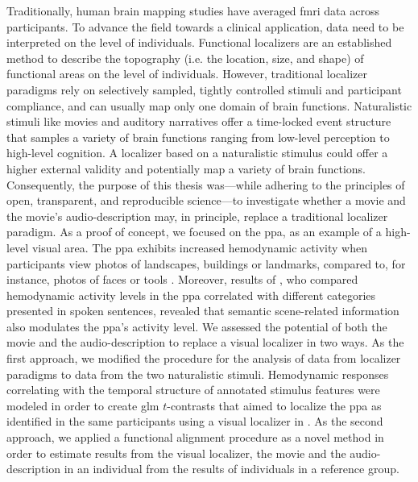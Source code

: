 %
Traditionally, human brain mapping studies have averaged \ac{fmri} data across
participants.
%
To advance the field towards a clinical application, data need to be interpreted
on the level of individuals.
Functional localizers are an established method to describe the topography (i.e.
the location, size, and shape) of functional areas on the level of individuals.
However, traditional localizer paradigms rely on selectively sampled, tightly
controlled stimuli and participant compliance, and can usually map only one
domain of brain functions.
Naturalistic stimuli like movies and auditory narratives offer a time-locked
event structure that samples a variety of brain functions ranging from low-level
perception to high-level cognition.
%
A localizer based on a naturalistic stimulus could offer a higher external
validity and potentially map a variety of brain functions.
Consequently, the purpose of this thesis was---while adhering to the principles
of open, transparent, and reproducible science---to investigate whether a movie
and the movie's audio-description may, in principle, replace a traditional
localizer paradigm.
As a proof of concept, we focused on the \ac{ppa}, as an example of a high-level
visual area.
%
The \ac{ppa} exhibits increased hemodynamic activity when participants view
photos of landscapes, buildings or landmarks, compared to, for instance, photos
of faces or tools \citep[cf,][for reviews]{epstein2014neural, aminoff2013role}.
%
Moreover, results of \citet{aziz2008modulation}, who compared hemodynamic
activity levels in the \ac{ppa} correlated with different categories presented
in spoken sentences, revealed that semantic scene-related information also
modulates the \ac{ppa}'s activity level.
%
We assessed the potential of both the movie and the audio-description to replace
a visual localizer in two ways.
%
As the first approach, we  modified the procedure for the analysis of data from
localizer paradigms to data from the two naturalistic stimuli.
%
Hemodynamic responses correlating with the temporal structure of annotated
stimulus features \citep[cf.][]{haeusler2016cutanno, haeusler2021speechanno}
were modeled in order to create \ac{glm} $t$-contrasts that aimed to localize
the \ac{ppa} as identified in the same participants using a visual localizer in
\citet{sengupta2016extension}.
As the second approach, we applied a functional alignment procedure as a novel
method in order to estimate results from the visual localizer, the movie and the
audio-description in an individual from the results of individuals in a
reference group.



